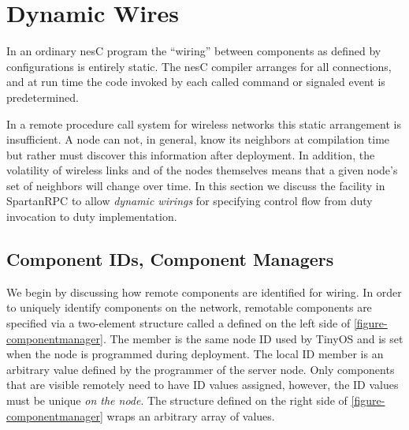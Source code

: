 \section{Dynamic Wires}
\label{section-dynamic-wires}

In an ordinary nesC program the ``wiring'' between components as defined
by configurations is entirely static. The nesC compiler arranges for all
connections, and at run time the code invoked by each called command or
signaled event is predetermined.

In a remote procedure call system for wireless networks this static
arrangement is insufficient. A node can not, in general, know its
neighbors at compilation time but rather must discover this information
after deployment. In addition, the volatility of wireless links and of
the nodes themselves means that a given node's set of neighbors will
change over time. In this section we discuss the facility in SpartanRPC
to allow \emph{dynamic wirings} for specifying control flow from duty
invocation to duty implementation.

\subsection{Component IDs, Component Managers}
\label{section-componentmanager}

We begin by discussing how remote components are identified for wiring.
In order to uniquely identify components on the network, remotable
components are specified via a two-element structure called a
 defined on the left side of
\autoref{figure-componentmanager}. The  member is the
same node ID used by TinyOS and is set when the node is programmed
during deployment. The local ID member is an arbitrary value defined by
the programmer of the server node. Only components that are visible
remotely need to have ID values assigned, however, the ID values must be
unique \emph{on the node}. The  structure defined
on the right side of \autoref{figure-componentmanager} wraps an
arbitrary array of  values.
 

